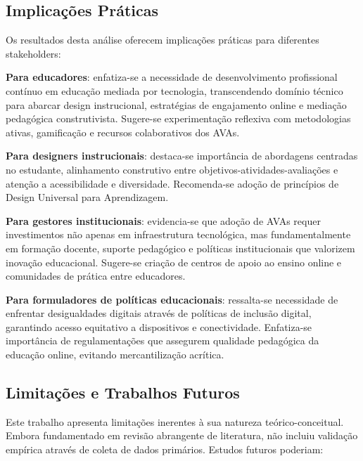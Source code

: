 \documentclass[portuguese]{sbc2025}%
\begin{document}
\subsection{Implicações Práticas}

Os resultados desta análise oferecem implicações práticas para diferentes stakeholders:

\textbf{Para educadores}: enfatiza-se a necessidade de desenvolvimento profissional contínuo em educação mediada por tecnologia, transcendendo domínio técnico para abarcar design instrucional, estratégias de engajamento online e mediação pedagógica construtivista. Sugere-se experimentação reflexiva com metodologias ativas, gamificação e recursos colaborativos dos AVAs.

\textbf{Para designers instrucionais}: destaca-se importância de abordagens centradas no estudante, alinhamento construtivo entre objetivos-atividades-avaliações e atenção a acessibilidade e diversidade. Recomenda-se adoção de princípios de Design Universal para Aprendizagem.

\textbf{Para gestores institucionais}: evidencia-se que adoção de AVAs requer investimentos não apenas em infraestrutura tecnológica, mas fundamentalmente em formação docente, suporte pedagógico e políticas institucionais que valorizem inovação educacional. Sugere-se criação de centros de apoio ao ensino online e comunidades de prática entre educadores.

\textbf{Para formuladores de políticas educacionais}: ressalta-se necessidade de enfrentar desigualdades digitais através de políticas de inclusão digital, garantindo acesso equitativo a dispositivos e conectividade. Enfatiza-se importância de regulamentações que assegurem qualidade pedagógica da educação online, evitando mercantilização acrítica.

\subsection{Limitações e Trabalhos Futuros}

Este trabalho apresenta limitações inerentes à sua natureza teórico-conceitual. Embora fundamentado em revisão abrangente de literatura, não incluiu validação empírica através de coleta de dados primários. Estudos futuros poderiam:
\end{document}
